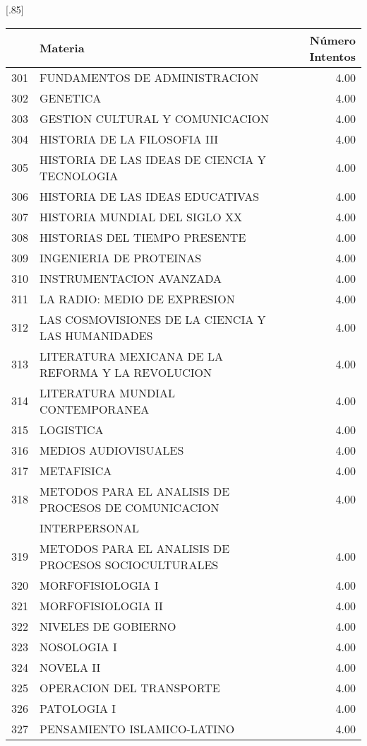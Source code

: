 \documentclass[12pt]{article}
\begin{document}
\begin{table}[ht]
\centering
\scalebox{0.75}[.85]{
\begin{tabular}{rlr}
  \hline
 & Materia & N\'umero Intentos\\ 
  \hline
    301 & FUNDAMENTOS DE ADMINISTRACION & 4.00 \\ 
  302 & GENETICA & 4.00 \\ 
  303 & GESTION CULTURAL Y COMUNICACION & 4.00 \\ 
    304 & HISTORIA DE LA FILOSOFIA III & 4.00 \\ 
  305 & HISTORIA DE LAS IDEAS DE CIENCIA Y TECNOLOGIA & 4.00 \\ 
 306 & HISTORIA DE LAS IDEAS EDUCATIVAS & 4.00 \\ 
  307 & HISTORIA MUNDIAL DEL SIGLO XX & 4.00 \\ 
  308 & HISTORIAS DEL TIEMPO PRESENTE & 4.00 \\ 
  309 & INGENIERIA DE PROTEINAS & 4.00 \\ 
  310 & INSTRUMENTACION AVANZADA & 4.00 \\ 
  311 & LA RADIO: MEDIO DE EXPRESION & 4.00 \\ 
  312 & LAS COSMOVISIONES DE LA CIENCIA Y LAS HUMANIDADES & 4.00 \\ 
  313 & LITERATURA MEXICANA DE LA REFORMA Y LA REVOLUCION & 4.00 \\ 
  314 & LITERATURA MUNDIAL CONTEMPORANEA & 4.00 \\ 
  315 & LOGISTICA & 4.00 \\ 
  316 & MEDIOS AUDIOVISUALES & 4.00 \\ 
  317 & METAFISICA & 4.00 \\ 
  318 & METODOS PARA EL ANALISIS DE PROCESOS DE COMUNICACION  & 4.00 \\
   & INTERPERSONAL &  \\ 
  319 & METODOS PARA EL ANALISIS DE PROCESOS SOCIOCULTURALES & 4.00 \\ 
  320 & MORFOFISIOLOGIA I & 4.00 \\ 
  321 & MORFOFISIOLOGIA II & 4.00 \\ 
  322 & NIVELES DE GOBIERNO & 4.00 \\ 
  323 & NOSOLOGIA I & 4.00 \\ 
  324 & NOVELA II & 4.00 \\ 
  325 & OPERACION DEL TRANSPORTE & 4.00 \\ 
  326 & PATOLOGIA I & 4.00 \\ 
  327& PENSAMIENTO ISLAMICO-LATINO & 4.00 \\ 

\end{tabular}}
\end{table}
\end{document}
